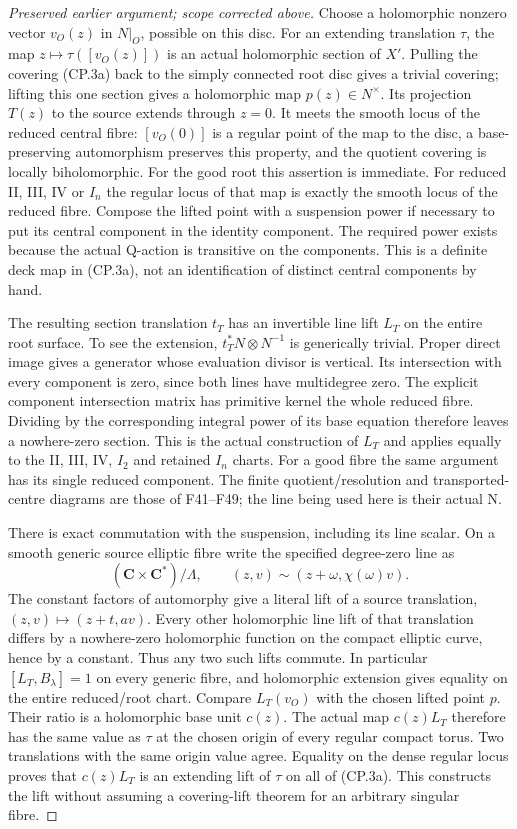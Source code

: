 \begin{proof}[Preserved earlier argument; scope corrected above]
Choose a holomorphic nonzero vector \(v_O(z)\) in \(N|_O\), possible
on this disc. For an extending translation \(\tau\), the map
\(z\mapsto\tau([v_O(z)])\) is an actual holomorphic section of
\(X'\). Pulling the covering (CP.3a) back to the simply connected
root disc gives a trivial covering; lifting this one section gives
a holomorphic map \(p(z)\in N^\times\). Its projection \(T(z)\)
to the source extends through \(z=0\). It meets the smooth locus
of the reduced central fibre: \([v_O(0)]\) is a regular point of
the map to the disc, a base-preserving automorphism preserves this
property, and the quotient covering is locally biholomorphic. For
the good root this assertion is immediate. For reduced II, III,
IV or \(I_n\) the regular locus of that map is exactly the smooth locus
of the reduced fibre. Compose the lifted point with a suspension
power if necessary to put its central component in the identity
component. The required power exists because the actual Q-action
is transitive on the components. This is a definite deck map in
(CP.3a), not an identification of distinct central components by hand.

The resulting section translation \(t_T\) has an invertible line
lift \(L_T\) on the entire root surface. To see the extension,
\(t_T^*N\otimes N^{-1}\) is generically trivial. Proper direct
image gives a generator whose evaluation divisor is vertical. Its
intersection with every component is zero, since both lines have
multidegree zero. The explicit component intersection matrix has
primitive kernel the whole reduced fibre. Dividing by the
corresponding integral power of its base equation therefore leaves
a nowhere-zero section. This is the actual construction of \(L_T\)
and applies equally to the II, III, IV, \(I_2\) and retained \(I_n\) charts.
For a good fibre the same argument has its single reduced component.
The finite quotient/resolution and transported-centre diagrams are
those of F41--F49; the line being used here is their actual N.

There is exact commutation with the suspension, including its line
scalar. On a smooth generic source elliptic fibre write the
specified degree-zero line as
\[
 (\mathbf C\times\mathbf C^*)/\Lambda,\qquad
 (z,v)\sim(z+\omega,\chi(\omega)v).
\]
The constant factors of automorphy give a literal lift of a source
translation, \((z,v)\mapsto(z+t,av)\). Every other holomorphic
line lift of that translation differs by a nowhere-zero holomorphic
function on the compact elliptic curve, hence by a constant. Thus
any two such lifts commute. In particular \([L_T,B_\lambda]=1\)
on every generic fibre, and holomorphic extension gives equality
on the entire reduced/root chart. Compare \(L_T(v_O)\) with the
chosen lifted point \(p\). Their ratio is a holomorphic base unit
\(c(z)\). The actual map \(c(z)L_T\) therefore has the same value
as \(\tau\) at the chosen origin of every regular compact torus.
Two translations with the same origin value agree. Equality on the
dense regular locus proves that \(c(z)L_T\) is an extending lift of
\(\tau\) on all of (CP.3a). This constructs the lift without
assuming a covering-lift theorem for an arbitrary singular fibre.


\end{proof}
